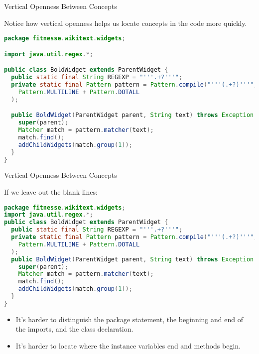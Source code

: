 \documentclass{beamer}
\begin{document}
\begin{frame}[fragile]{Vertical Openness Between Concepts}


Notice how vertical openness helps us locate concepts in the code more quickly.
\begin{lstlisting}[language=Java]
package fitnesse.wikitext.widgets;

import java.util.regex.*;

public class BoldWidget extends ParentWidget {
  public static final String REGEXP = "'''.+?'''";
  private static final Pattern pattern = Pattern.compile("'''(.+?)'''",
    Pattern.MULTILINE + Pattern.DOTALL
  );

  public BoldWidget(ParentWidget parent, String text) throws Exception { 
    super(parent);
    Matcher match = pattern.matcher(text);
    match.find();
    addChildWidgets(match.group(1));
  }
}
\end{lstlisting}

\end{frame}

\begin{frame}[fragile]{Vertical Openness Between Concepts}


If we leave out the blank lines:
\vspace{-.05in}
\begin{lstlisting}[language=Java]
package fitnesse.wikitext.widgets;
import java.util.regex.*;
public class BoldWidget extends ParentWidget {
  public static final String REGEXP = "'''.+?'''";
  private static final Pattern pattern = Pattern.compile("'''(.+?)'''",
    Pattern.MULTILINE + Pattern.DOTALL
  );
  public BoldWidget(ParentWidget parent, String text) throws Exception { 
    super(parent);
    Matcher match = pattern.matcher(text);
    match.find();
    addChildWidgets(match.group(1));
  }
}
\end{lstlisting}
\vspace{-.05in}
\begin{itemize}
\item It's harder to distinguish the package statement, the beginning and end of the imports, and the class declaration.
\item It's harder to locate where the instance variables end and methods begin.
\end{itemize}

\end{frame}
\end{document}
